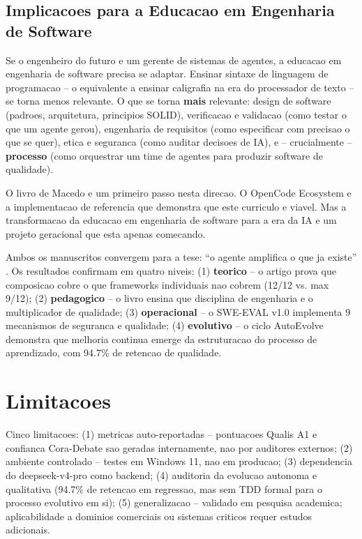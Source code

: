 \documentclass[12pt,a4paper,oneside,sumario=tradicional,chapter=TITLE,section=TITLE,subsection=TITLE,english,brazil]{abntex2}
\begin{document}
\subsection{Implicacoes para a Educacao em Engenharia de Software}

Se o engenheiro do futuro e um gerente de sistemas de agentes, a educacao em engenharia de software precisa se adaptar. Ensinar sintaxe de linguagem de programacao -- o equivalente a ensinar caligrafia na era do processador de texto -- se torna menos relevante. O que se torna \textbf{mais} relevante: design de software (padroes, arquitetura, principios SOLID), verificacao e validacao (como testar o que um agente gerou), engenharia de requisitos (como especificar com precisao o que se quer), etica e seguranca (como auditar decisoes de IA), e -- crucialmente -- \textbf{processo} (como orquestrar um time de agentes para produzir software de qualidade).

O livro de Macedo \cite{macedo2026engenharia} e um primeiro passo nesta direcao. O OpenCode Ecosystem e a implementacao de referencia que demonstra que este curriculo e viavel. Mas a transformacao da educacao em engenharia de software para a era da IA e um projeto geracional que esta apenas comecando.

Ambos os manuscritos convergem para a tese: ``o agente amplifica o que ja existe'' \cite[Cap. 2.7]{macedo2026engenharia}. Os resultados confirmam em quatro niveis: (1) \textbf{teorico} -- o artigo prova que composicao cobre o que frameworks individuais nao cobrem (12/12 vs. max 9/12); (2) \textbf{pedagogico} -- o livro ensina que disciplina de engenharia e o multiplicador de qualidade; (3) \textbf{operacional} -- o SWE-EVAL v1.0 implementa 9 mecanismos de seguranca e qualidade; (4) \textbf{evolutivo} -- o ciclo AutoEvolve demonstra que melhoria continua emerge da estruturacao do processo de aprendizado, com 94.7\% de retencao de qualidade.

\section{Limitacoes}

Cinco limitacoes: (1) metricas auto-reportadas -- pontuacoes Qualis A1 e confianca Cora-Debate sao geradas internamente, nao por auditores externos; (2) ambiente controlado -- testes em Windows 11, nao em producao; (3) dependencia do deepseek-v4-pro como backend; (4) auditoria da evolucao autonoma e qualitativa (94.7\% de retencao em regressao, mas sem TDD formal para o processo evolutivo em si); (5) generalizacao -- validado em pesquisa academica; aplicabilidade a dominios comerciais ou sistemas criticos requer estudos adicionais.
\end{document}
